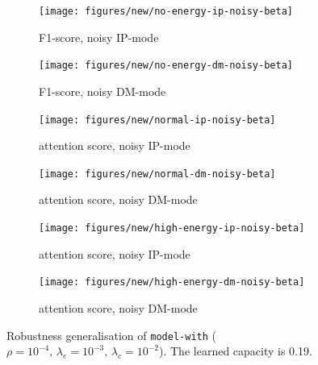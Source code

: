 \begin{figure}[!h]
\centering
\begin{subfigure}{.5\textwidth}
  \centering
  \texttt{[image: figures/new/no-energy-ip-noisy-beta]}
  \caption{F1-score, noisy IP-mode}
  \label{fig:exp-10-a}
\end{subfigure}%
\begin{subfigure}{.5\textwidth}
  \centering
  \texttt{[image: figures/new/no-energy-dm-noisy-beta]}
  \caption{F1-score, noisy DM-mode}
 \label{fig:exp-10-b} 
\end{subfigure}
\begin{subfigure}{.5\textwidth}
  \centering
  \texttt{[image: figures/new/normal-ip-noisy-beta]}
  \caption{attention score, noisy IP-mode}
   \label{fig:exp-10-c} 
\end{subfigure}%
\begin{subfigure}{.5\textwidth}
  \centering
  \texttt{[image: figures/new/normal-dm-noisy-beta]}
  \caption{attention score, noisy DM-mode}
   \label{fig:exp-10-d} 
\end{subfigure}
\begin{subfigure}{.5\textwidth}
  \centering
  \texttt{[image: figures/new/high-energy-ip-noisy-beta]}
  \caption{attention score, noisy IP-mode}
   \label{fig:exp-10-e} 
\end{subfigure}%
\begin{subfigure}{.5\textwidth}
  \centering
  \texttt{[image: figures/new/high-energy-dm-noisy-beta]}
  \caption{attention score, noisy DM-mode}
   \label{fig:exp-10-f} 
\end{subfigure}
\caption[Robustness generalisation]{Robustness generalisation of \texttt{model-with} ($\rho=10^{-4},\,\lambda_e=10^{-3},\,\lambda_c=10^{-2}$). The learned capacity is 0.19.}
\label{fig:exp-10}
\end{figure}

